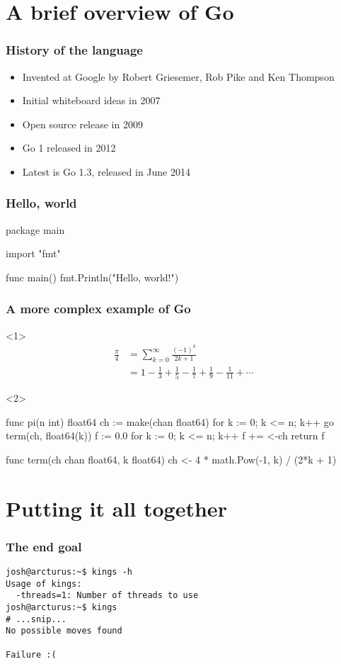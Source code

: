 \documentclass{beamer}
\begin{document}
\section{A brief overview of Go}

\begin{frame}
\frametitle{History of the language}
\begin{itemize}
  \item Invented at Google by Robert Griesemer, Rob Pike and
    Ken Thompson
  \item Initial whiteboard ideas in 2007
  \item Open source release in 2009
  \item Go 1 released in 2012
  \item Latest is Go 1.3, released in June 2014
\end{itemize}
\end{frame}

\begin{frame}[fragile]
\frametitle{Hello, world}
\begin{gocode}
package main

import "fmt"

func main() {
        fmt.Println("Hello, world!")
}
\end{gocode}
\end{frame}

\begin{frame}[fragile]
\frametitle{A more complex example of Go}
\begin{onlyenv}<1>
\begin{align*}
\frac{\pi}{4} &= \sum_{k=0}^{\infty} \frac{(-1)^k}{2k + 1} \\
              &= 1 - \frac{1}{3} + \frac{1}{5} - \frac{1}{7} +
                 \frac{1}{9} - \frac{1}{11} + \cdots
\end{align*}
\end{onlyenv}
\begin{onlyenv}<2>
\begin{gocode}
func pi(n int) float64 {
        ch := make(chan float64)
        for k := 0; k <= n; k++ {
                go term(ch, float64(k))
        }
        f := 0.0
        for k := 0; k <= n; k++ {
                f += <-ch
        }
        return f
}

func term(ch chan float64, k float64) {
        ch <- 4 * math.Pow(-1, k) / (2*k + 1)
}
\end{gocode}
\end{onlyenv}
\end{frame}


\section{Putting it all together}

\begin{frame}[fragile]
\frametitle{The end goal}
\begin{verbatim}
josh@arcturus:~$ kings -h
Usage of kings:
  -threads=1: Number of threads to use
josh@arcturus:~$ kings
# ...snip...
No possible moves found

Failure :(
\end{verbatim}
\end{frame}
\end{document}
